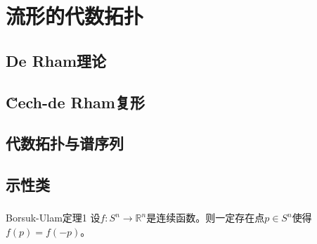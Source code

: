 \ifx\allfiles\undefined

	
	
\else
\fi

\part{流形的代数拓扑}

\chapter{De Rham理论}
\section{}
\begin{proposition}{}
   
\end{proposition}
\chapter{\u{C}ech-de Rham复形}

\chapter{代数拓扑与谱序列}

\chapter{示性类}
\section{}
\begin{theorem}{Borsuk-Ulam定理1}
    设$f:S^n \to \mathbb{R}^n$是连续函数。则一定存在点$p \in S^n$使得$f(p)=f(-p)$。
\end{theorem}
\ifx\allfiles\undefined
	
	
	
	
	\else
	\fi